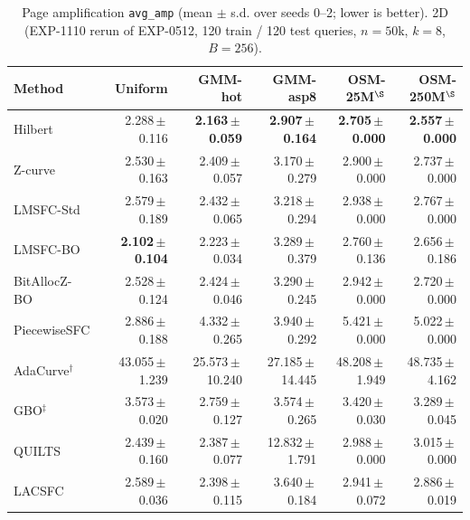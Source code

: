 
\begin{table}[t]
\centering\small
\caption{Page amplification \texttt{avg\_amp} (mean $\pm$ s.d. over seeds 0--2; lower is better). 2D (EXP-1110 rerun of EXP-0512, 120 train / 120 test queries, $n=50$k, $k=8$, $B=256$).}
\label{tab:exp1110_2d_avg_amp}
\begin{tabular}{lrrrrr}
\toprule
Method & Uniform & GMM-hot & GMM-asp8 & OSM-25M$^\S$ & OSM-250M$^\S$ \\
\midrule
Hilbert & 2.288\,$\pm$\,0.116 & \textbf{2.163\,$\pm$\,0.059} & \textbf{2.907\,$\pm$\,0.164} & \textbf{2.705\,$\pm$\,0.000} & \textbf{2.557\,$\pm$\,0.000} \\
Z-curve & 2.530\,$\pm$\,0.163 & 2.409\,$\pm$\,0.057 & 3.170\,$\pm$\,0.279 & 2.900\,$\pm$\,0.000 & 2.737\,$\pm$\,0.000 \\
LMSFC-Std & 2.579\,$\pm$\,0.189 & 2.432\,$\pm$\,0.065 & 3.218\,$\pm$\,0.294 & 2.938\,$\pm$\,0.000 & 2.767\,$\pm$\,0.000 \\
LMSFC-BO & \textbf{2.102\,$\pm$\,0.104} & 2.223\,$\pm$\,0.034 & 3.289\,$\pm$\,0.379 & 2.760\,$\pm$\,0.136 & 2.656\,$\pm$\,0.186 \\
BitAllocZ-BO & 2.528\,$\pm$\,0.124 & 2.424\,$\pm$\,0.046 & 3.290\,$\pm$\,0.245 & 2.942\,$\pm$\,0.000 & 2.720\,$\pm$\,0.000 \\
PiecewiseSFC & 2.886\,$\pm$\,0.188 & 4.332\,$\pm$\,0.265 & 3.940\,$\pm$\,0.292 & 5.421\,$\pm$\,0.000 & 5.022\,$\pm$\,0.000 \\
AdaCurve$^\dagger$ & 43.055\,$\pm$\,1.239 & 25.573\,$\pm$\,10.240 & 27.185\,$\pm$\,14.445 & 48.208\,$\pm$\,1.949 & 48.735\,$\pm$\,4.162 \\
GBO$^\ddagger$ & 3.573\,$\pm$\,0.020 & 2.759\,$\pm$\,0.127 & 3.574\,$\pm$\,0.265 & 3.420\,$\pm$\,0.030 & 3.289\,$\pm$\,0.045 \\
QUILTS & 2.439\,$\pm$\,0.160 & 2.387\,$\pm$\,0.077 & 12.832\,$\pm$\,1.791 & 2.988\,$\pm$\,0.000 & 3.015\,$\pm$\,0.000 \\
LACSFC & 2.589\,$\pm$\,0.036 & 2.398\,$\pm$\,0.115 & 3.640\,$\pm$\,0.184 & 2.941\,$\pm$\,0.072 & 2.886\,$\pm$\,0.019 \\
\bottomrule
\end{tabular}
\end{table}

